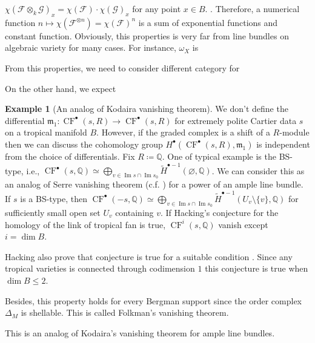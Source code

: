 \documentclass[a4paper,dvipdfmx,reqno,12pt]{amsart}
\theoremstyle{definition}
\newtheorem{Eg}[Thm]{Example}
\newcommand{\deq}{\coloneqq}
\newcommand{\emp}{\varnothing}%
\newcommand{\Q}{\mathbb{Q}}%
\newcommand{\mcal}[1]{\mathcal{#1}}%
\newcommand{\mf}[1]{\mathfrak{#1}}%
\newcommand{\opn}[1]{\operatorname{#1}}
\numberwithin{equation}{section}
\begin{document}
$\chi(\mcal{F}\otimes_k \mcal{G})_x
  =\chi(\mcal{F})\cdot \chi(\mcal{G})_x$ for any point
$x\in B$.
\cite[(9.7.2)]{MR1299726}.
Therefore, a numerical function
$n\mapsto \chi(\mcal{F}^{\otimes n})=\chi(\mcal{F})^{n}$
is a sum of exponential functions and constant function.
Obviously, this properties is very far
from line bundles on algebraic variety for many cases.
For instance, $\omega_X$ is

From this properties, we need to consider different category
for

On the other hand, we expect

\begin{Eg}[An analog of Kodaira vanishing theorem]

  We don't define the differential
  $\mf{m}_1:\opn{CF}^{\bullet}(s,R)\to \opn{CF}^{\bullet}(s,R)$
  for extremely polite Cartier data $s$ on a tropical manifold $B$. However, if the graded complex
  is a shift of a $R$-module then we can discuss
  the cohomology group $H^{\bullet}(\opn{CF}^{\bullet}(s,R),\mf{m}_1)$
  is independent from the choice of differentials. Fix $R\deq\Q$.
  One of typical example is the BS-type, i.e.,
  $\opn{CF}^{\bullet}(s,\Q)\simeq
    \bigoplus_{v\in \opn{Im}s\cap \opn{Im}s_0}\tilde{H}^{\bullet-1}(\emp,\Q)$.
  We can consider this as an analog of Serre vanishing theorem
  (c.f. \cite[III. Proposition 5.3]{hartshorneAlgebraicGeometry1977a}) for a power of an ample line bundle.
  If $s$ is a BS-type, then $\opn{CF}^{\bullet}(-s,\Q)\simeq
    \bigoplus_{v\in \opn{Im}s\cap \opn{Im}s_0}\tilde{H}^{\bullet-1}(U_v\setminus \{v\},\Q)$
  for sufficiently small open set $U_v$ containing $v$.
  If Hacking's conjecture for the homology of the link of tropical fan
  \cite{MR2452307} is true, $\opn{CF}^{i}(s,\Q)$ vanish except $i=\dim B$.

  Hacking also prove that conjecture is true for a suitable condition
  \cite[Theorem 2.5]{MR2452307}. Since any tropical varieties is connected
  through codimension $1$ \cite[Theorem 3.3.5]{maclaganIntroductionTropicalGeometry2015a}
  this conjecture is true when $\dim B \leq 2$.

  Besides, this property holds for every Bergman support since the order complex
  $\Delta_M$ is shellable. This is called Folkman's vanishing theorem.



  This is an analog of Kodaira's vanishing theorem for ample line bundles.

\end{Eg}
\end{document}
